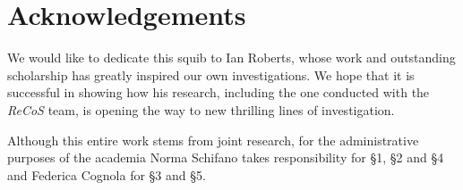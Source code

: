 \documentclass[output=paper]{langsci/langscibook}
\begin{document}
\printchapterglossary{}

\section*{Acknowledgements}

We would like to dedicate this squib to Ian Roberts, whose work and outstanding
scholarship has greatly inspired our own investigations. We hope that it is
successful in showing how his research, including the one conducted with the
\emph{ReCoS} team, is opening the way to new thrilling lines of investigation.

Although this entire work stems from joint research, for the administrative
purposes of the  academia Norma Schifano takes responsibility for §1,
§2 and §4 and Federica Cognola for §3 and §5.

\nocite{IlNovellino,Monumenti}
\printbibliography[heading=subbibliography, title={Sources},
keyword={23-source}]

{\sloppy
\printbibliography[heading=subbibliography,notkeyword=this,notkeyword=23-source]
}
\end{document}
